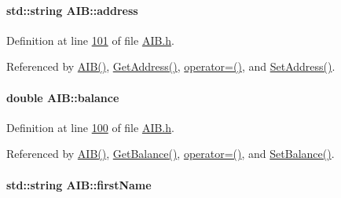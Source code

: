 \paragraph[{\texorpdfstring{address}{address}}]{\setlength{\rightskip}{0pt plus 5cm}std\+::string A\+I\+B\+::address\hspace{0.3cm}{\ttfamily [private]}}\hypertarget{class_a_i_b_ae6a67cc33d1e5fa83a52a238e45ca3dc_ae6a67cc33d1e5fa83a52a238e45ca3dc}{}\label{class_a_i_b_ae6a67cc33d1e5fa83a52a238e45ca3dc_ae6a67cc33d1e5fa83a52a238e45ca3dc}


Definition at line \hyperlink{_a_i_b_8h_source_l00101}{101} of file \hyperlink{_a_i_b_8h_source}{A\+I\+B.\+h}.



Referenced by \hyperlink{_a_i_b_8h_source_l00023}{A\+I\+B()}, \hyperlink{_a_i_b_8cpp_source_l00059}{Get\+Address()}, \hyperlink{_a_i_b_8h_source_l00066}{operator=()}, and \hyperlink{_a_i_b_8cpp_source_l00055}{Set\+Address()}.

\paragraph[{\texorpdfstring{balance}{balance}}]{\setlength{\rightskip}{0pt plus 5cm}double A\+I\+B\+::balance\hspace{0.3cm}{\ttfamily [private]}}\hypertarget{class_a_i_b_a3c8d637bd997c1f062d844a88e2559ba_a3c8d637bd997c1f062d844a88e2559ba}{}\label{class_a_i_b_a3c8d637bd997c1f062d844a88e2559ba_a3c8d637bd997c1f062d844a88e2559ba}


Definition at line \hyperlink{_a_i_b_8h_source_l00100}{100} of file \hyperlink{_a_i_b_8h_source}{A\+I\+B.\+h}.



Referenced by \hyperlink{_a_i_b_8h_source_l00023}{A\+I\+B()}, \hyperlink{_a_i_b_8cpp_source_l00067}{Get\+Balance()}, \hyperlink{_a_i_b_8h_source_l00066}{operator=()}, and \hyperlink{_a_i_b_8cpp_source_l00063}{Set\+Balance()}.

\paragraph[{\texorpdfstring{first\+Name}{firstName}}]{\setlength{\rightskip}{0pt plus 5cm}std\+::string A\+I\+B\+::first\+Name\hspace{0.3cm}{\ttfamily [private]}}\hypertarget{class_a_i_b_a869f72057cb63ebf0cfd257069e15c7c_a869f72057cb63ebf0cfd257069e15c7c}{}\label{class_a_i_b_a869f72057cb63ebf0cfd257069e15c7c_a869f72057cb63ebf0cfd257069e15c7c}


